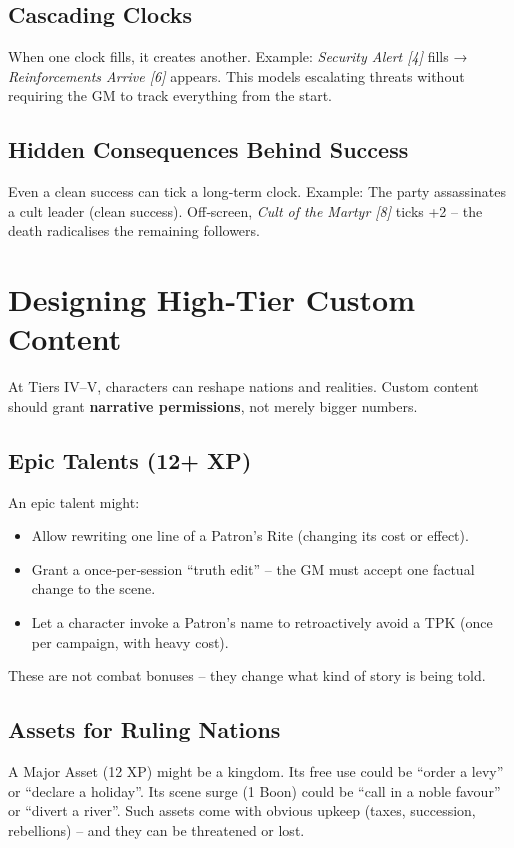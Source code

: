 \subsection*{Cascading Clocks}
When one clock fills, it creates another. Example: \emph{Security Alert [4]} fills → \emph{Reinforcements Arrive [6]} appears. This models escalating threats without requiring the GM to track everything from the start.

\subsection*{Hidden Consequences Behind Success}
Even a clean success can tick a long‑term clock. Example: The party assassinates a cult leader (clean success). Off‑screen, \emph{Cult of the Martyr [8]} ticks +2 – the death radicalises the remaining followers.

\section{Designing High‑Tier Custom Content}

At Tiers IV–V, characters can reshape nations and realities. Custom content should grant \textbf{narrative permissions}, not merely bigger numbers.

\subsection*{Epic Talents (12+ XP)}
An epic talent might:
\begin{itemize}
  \item Allow rewriting one line of a Patron’s Rite (changing its cost or effect).
  \item Grant a once‑per‑session “truth edit” – the GM must accept one factual change to the scene.
  \item Let a character invoke a Patron’s name to retroactively avoid a TPK (once per campaign, with heavy cost).
\end{itemize}
These are not combat bonuses – they change what kind of story is being told.

\subsection*{Assets for Ruling Nations}
A Major Asset (12 XP) might be a kingdom. Its free use could be “order a levy” or “declare a holiday”. Its scene surge (1 Boon) could be “call in a noble favour” or “divert a river”. Such assets come with obvious upkeep (taxes, succession, rebellions) – and they can be threatened or lost.

